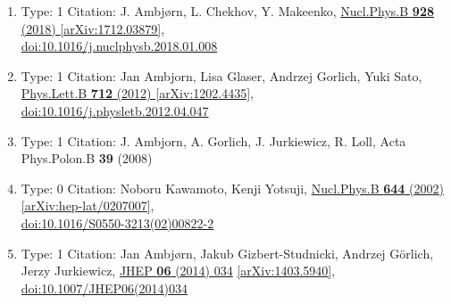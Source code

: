\documentclass[a4paper,10pt]{article}
\begin{document}
\begin{enumerate}
\begin{enumerate}
  \item Type: 1 Citation: J. Ambjørn, L. Chekhov, Y. Makeenko, \href{https://www.doi.org/10.1016/j.nuclphysb.2018.01.008}{Nucl.Phys.B {\bf 928} (2018) }  \href{https://arxiv.org/abs/1712.03879}{[arXiv:1712.03879]},\\\href{https://www.doi.org/10.1016/j.nuclphysb.2018.01.008}{doi:10.1016/j.nuclphysb.2018.01.008}
  \item Type: 1 Citation: Jan Ambjorn, Lisa Glaser, Andrzej Gorlich, Yuki Sato, \href{https://www.doi.org/10.1016/j.physletb.2012.04.047}{Phys.Lett.B {\bf 712} (2012) }  \href{https://arxiv.org/abs/1202.4435}{[arXiv:1202.4435]},\\\href{https://www.doi.org/10.1016/j.physletb.2012.04.047}{doi:10.1016/j.physletb.2012.04.047}
  \item Type: 1 Citation: J. Ambjorn, A. Gorlich, J. Jurkiewicz, R. Loll, Acta Phys.Polon.B {\bf 39} (2008) 
  \item Type: 0 Citation: Noboru Kawamoto, Kenji Yotsuji, \href{https://www.doi.org/10.1016/S0550-3213(02)00822-2}{Nucl.Phys.B {\bf 644} (2002) }  \href{https://arxiv.org/abs/hep-lat/0207007}{[arXiv:hep-lat/0207007]},\\\href{https://www.doi.org/10.1016/S0550-3213(02)00822-2}{doi:10.1016/S0550-3213(02)00822-2}
  \item Type: 1 Citation: Jan Ambjørn, Jakub Gizbert-Studnicki, Andrzej Görlich, Jerzy Jurkiewicz, \href{https://www.doi.org/10.1007/JHEP06(2014)034}{JHEP {\bf 06} (2014) 034}  \href{https://arxiv.org/abs/1403.5940}{[arXiv:1403.5940]},\\\href{https://www.doi.org/10.1007/JHEP06(2014)034}{doi:10.1007/JHEP06(2014)034}

\end{enumerate}
\end{enumerate}
\end{document}

